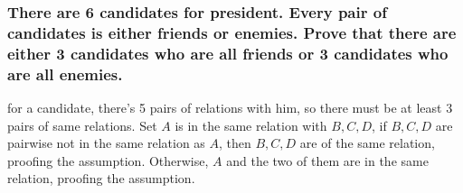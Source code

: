 \documentclass[12pt,a4paper]{ctexrep}
\begin{document}
\subsubsection{There are 6 candidates for president. Every pair of candidates is either friends or enemies. Prove that there are either 3 candidates who are all friends or 3 candidates who are all enemies.}
for a candidate, there's 5 pairs of relations with him, so there must be at least 3 pairs of same relations. Set $A$ is in the same relation with $B,C,D$, if $B,C,D$ are pairwise not in the same relation as $A$, then $B,C,D$ are of the same relation, proofing the assumption. Otherwise, $A$ and the two of them are in the same relation, proofing the assumption.

\ifdebug
\end{document}

